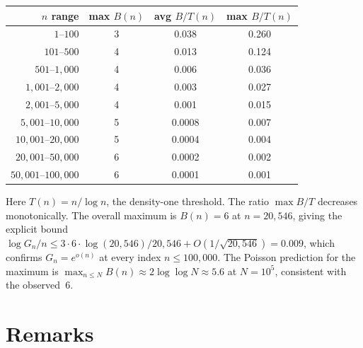 \documentclass[11pt]{article}
\theoremstyle{definition}
\theoremstyle{remark}
\begin{document}
\begin{center}
\begin{tabular}{rccc}
\toprule
$n$ range & max $B(n)$ & avg $B/T(n)$ & max $B/T(n)$ \\
\midrule
$1$--$100$ & 3 & 0.038 & 0.260 \\
$101$--$500$ & 4 & 0.013 & 0.124 \\
$501$--$1{,}000$ & 4 & 0.006 & 0.036 \\
$1{,}001$--$2{,}000$ & 4 & 0.003 & 0.027 \\
$2{,}001$--$5{,}000$ & 4 & 0.001 & 0.015 \\
$5{,}001$--$10{,}000$ & 5 & 0.0008 & 0.007 \\
$10{,}001$--$20{,}000$ & 5 & 0.0004 & 0.004 \\
$20{,}001$--$50{,}000$ & 6 & 0.0002 & 0.002 \\
$50{,}001$--$100{,}000$ & 6 & 0.0001 & 0.001 \\
\bottomrule
\end{tabular}
\end{center}
\smallskip
\noindent
Here $T(n) = n/\log n$, the density-one threshold.
The ratio $\max B/T$ decreases monotonically.
The overall maximum is $B(n) = 6$
at $n = 20{,}546$, giving the explicit bound
$\log G_n / n \le 3 \cdot 6 \cdot \log(20{,}546)/20{,}546
+ O(1/\sqrt{20{,}546}) = 0.009$,
which confirms $G_n = e^{o(n)}$ at
every index $n \le 100{,}000$.
The Poisson prediction for the maximum
is $\max_{n \le N} B(n) \approx 2\log\log N
\approx 5.6$ at $N = 10^5$,
consistent with the observed~$6$.

\section{Remarks}
\end{document}
